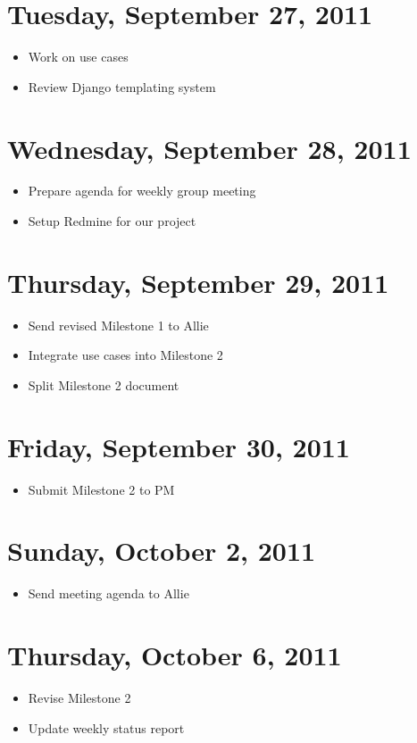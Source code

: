 \documentclass{article}
\begin{document}
\section{Tuesday, September 27, 2011}
\begin{itemize}
\item Work on use cases
\item Review Django templating system
\end{itemize}

\section{Wednesday, September 28, 2011}
\begin{itemize}
\item Prepare agenda for weekly group meeting
\item Setup Redmine for our project
\end{itemize}

\section{Thursday, September 29, 2011}
\begin{itemize}
\item Send revised Milestone 1 to Allie
\item Integrate use cases into Milestone 2
\item Split Milestone 2 document
\end{itemize}

\section{Friday, September 30, 2011}
\begin{itemize}
\item Submit Milestone 2 to PM
\end{itemize}

\section{Sunday, October 2, 2011}
\begin{itemize}
\item Send meeting agenda to Allie
\end{itemize}

\section{Thursday, October 6, 2011}
\begin{itemize}
\item Revise Milestone 2
\item Update weekly status report
\end{itemize}
\end{document}

